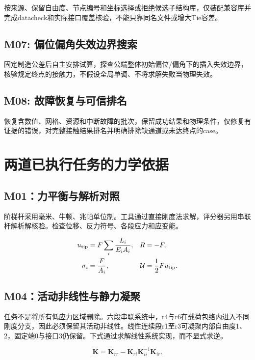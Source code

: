 \documentclass[UTF8,a4paper,11pt,fontset=windows]{ctexart}
\begin{document}
按来源、保留自由度、节点编号和坐标选择或拒绝候选子结构库，仅装配兼容库并完成datacheck和实际接口覆盖核验，不能只靠同名文件或增大Tie容差。

\subsection{M07: 偏位偏角失效边界搜索}

固定制造公差后自主安排试算，探查公端整体初始偏位/偏角下的插入失效边界，核验规定终点的接触力，不假设全局单调、不将求解失败当物理失效。

\subsection{M08: 故障恢复与可信排名}

恢复含数值、网格、资源和中断故障的批次，保留成功结果和物理条件，仅修复有证据的错误，对完整接触结果排名并明确排除缺通道或未达终点的case。

\section{两道已执行任务的力学依据}

\subsection{M01：力平衡与解析对照}

阶梯杆采用毫米、牛顿、兆帕单位制。工具通过直接刚度法求解，评分器另用串联杆解析解核验。检查位移、反力符号、各段应力和应变能。

\begin{align} u_{\rm tip}&=F\sum_i\frac{L_i}{E_i A_i}, & R&=-F,\\ \sigma_i&=\frac{F}{A_i}, & \mathcal{U}&=\frac12 F u_{\rm tip}.\end{align}

\subsection{M04：活动非线性与静力凝聚}

任务不是将所有低应力区域删除。六段串联系统中，r4与r6在载荷包络内进入不同刚度分支，因此必须保留其活动非线性。线性连续段r1至r3可凝聚内部自由度1、2，固定端0与接口3仍保留。下式通过求解线性系统实现，而不显式求逆。

\begin{equation}\overline{\mathbf{K}}=\mathbf{K}_{rr}-\mathbf{K}_{ri}\mathbf{K}_{ii}^{-1}\mathbf{K}_{ir}.\end{equation}
\end{document}
